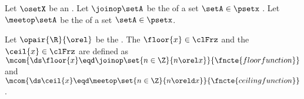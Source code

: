 \begin{lemma}
\label{lem:lubX}
Let $\osetX$ be an  .
Let $\joinop\setA$ be the   of a set $\setA\in\psetx$ .
Let $\meetop\setA$ be the   of a set $\setA\in\psetx$.
\end{lemma}

\begin{definition}
\label{def:ceil}
\label{def:floor}
Let $\opair{\R}{\orel}$ be the .
The  $\floor{x}\in\clFrz$ and
the  $\ceil{x}\in\clFrz$ are defined as
\\\indentx
  $\mcom{\ds\floor{x} \eqd \joinop\set{n\in\Z}{n\orel  x}}{\fncte{floor function}}$
  \quad and \quad
  $\mcom{\ds\ceil{x}  \eqd \meetop\set{n\in\Z}{n\oreld x}}{\fncte{ceiling function}}$.
\end{definition}

